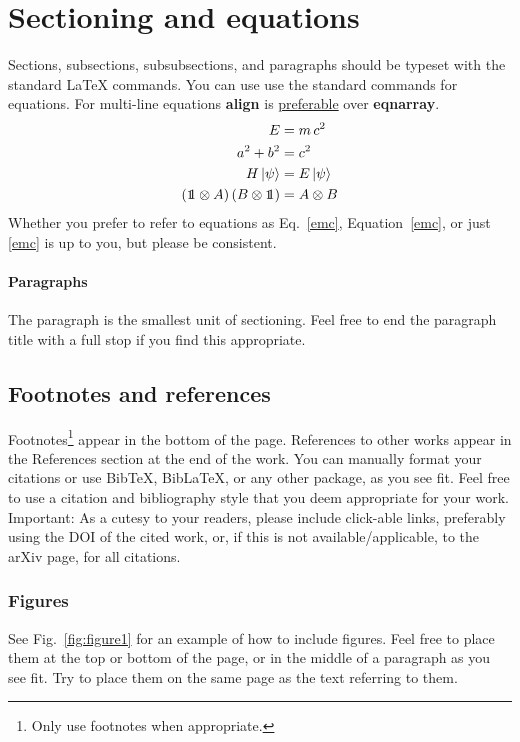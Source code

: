 \documentclass[prx,a4paper,aps,twocolumn,superscriptaddress,11pt]{quantumarticle}
\begin{document}
\section{Sectioning and equations}
\label{sec:sec1}
Sections, subsections, subsubsections, and paragraphs should be typeset with the standard LaTeX commands.
You can use use the standard commands for equations.
For multi-line equations \textbf{align} is \href{http://tex.stackexchange.com/questions/196/eqnarray-vs-align}{preferable} over \textbf{eqnarray}.
\begin{align}
  \label{emc}
  E &= m\,c^2\\
  a^2 + b^2 &= c^2\\
  H\,|\psi\rangle &= E\,|\psi\rangle\\
  ({\mbox{\small1}\mkern-5.5mu1} \otimes A)\,(B \otimes {\mbox{\small1}\mkern-5.5mu1}) &= A \otimes B
\end{align}
Whether you prefer to refer to equations as Eq.~\eqref{emc}, Equation~\ref{emc}, or just \eqref{emc} is up to you, but please be consistent.

\paragraph{Paragraphs}
The paragraph is the smallest unit of sectioning.
Feel free to end the paragraph title with a full stop if you find this appropriate.

\subsection{Footnotes and references}
\label{sec:subsec1}
Footnotes\footnote{Only use footnotes when appropriate.} appear in the bottom of the page.
References to other works \cite{Foo2035} appear in the References section at the end of the work.
You can manually format your citations or use BibTeX, BibLaTeX, or any other package, as you see fit.
Feel free to use a citation and bibliography style that you deem appropriate for your work.
Important: As a cutesy to your readers, please include click-able links, preferably using the DOI of the cited work, or, if this is not available/applicable, to the arXiv page, for all citations.  

\subsubsection{Figures}
See Fig.~\ref{fig:figure1} for an example of how to include figures.
Feel free to place them at the top or bottom of the page, or in the middle of a paragraph as you see fit.
Try to place them on the same page as the text referring to them.
\end{document}
